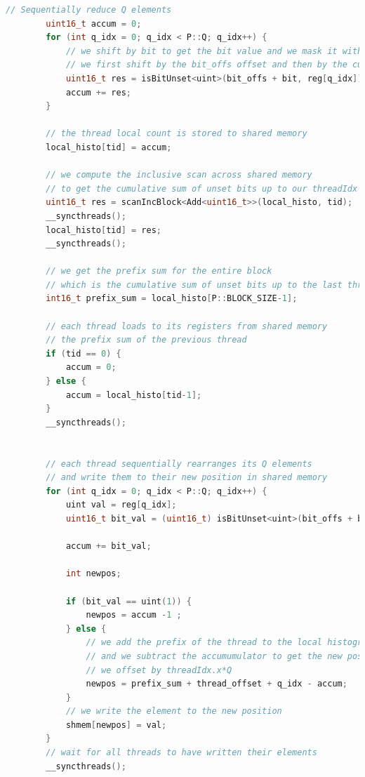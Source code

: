 \documentclass{article}
\begin{document}
\begin{lstlisting}[language=c++]
  // Sequentially reduce Q elements
        uint16_t accum = 0;
        for (int q_idx = 0; q_idx < P::Q; q_idx++) {
            // we shift by bit to get the bit value and we mask it with 1 to get the boolean value
            // we first shift by the bit_offs offset and then by the current bit from 0 to lgH-1
            uint16_t res = isBitUnset<uint>(bit_offs + bit, reg[q_idx]);
            accum += res;
        }
        
        // the thread local count is stored to shared memory
        local_histo[tid] = accum;

        // we compute the inclusive scan across shared memory
        // to get the cumulative sum of unset bits up to our threadIdx
        uint16_t res = scanIncBlock<Add<uint16_t>>(local_histo, tid);
        __syncthreads();
        local_histo[tid] = res;
        __syncthreads();

        // we get the prefix sum for the entire block
        // which is the cumulative sum of unset bits up to the last thread in the block
        int16_t prefix_sum = local_histo[P::BLOCK_SIZE-1];

        // each thread loads to its registers from shared memory
        // the prefix sum of the previous thread
        if (tid == 0) {
            accum = 0; 
        } else {
            accum = local_histo[tid-1];
        }
        __syncthreads();


        // each thread sequentially rearranges its Q elements
        // and write them to their new position in shared memory
        for (int q_idx = 0; q_idx < P::Q; q_idx++) {
            uint val = reg[q_idx];
            uint16_t bit_val = (uint16_t) isBitUnset<uint>(bit_offs + bit, val);
            
            accum += bit_val;

            int newpos;

            if (bit_val == uint(1)) {
                newpos = accum -1 ;
            } else {
                // we add the prefix of the thread to the local histogram position
                // and we subtract the accumumulator to get the new position
                // we offset by threadIdx.x*Q 
                newpos = prefix_sum + thread_offset + q_idx - accum;
            }
            // we write the element to the new position
            shmem[newpos] = val;
        }
        // wait for all threads to have written their elements
        __syncthreads();



\end{lstlisting}
\end{document}
